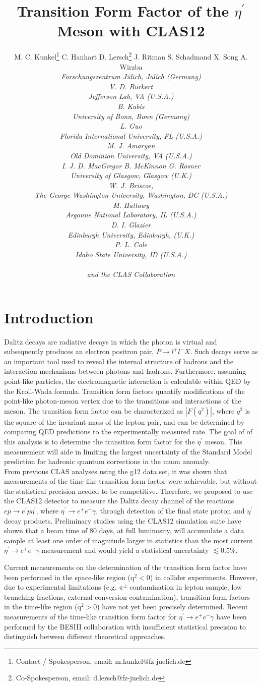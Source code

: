 \documentclass[11pt,a4paper,twocolumn]{article}
\title{Transition Form Factor of the $\eta^{\prime}$ Meson with CLAS12}
\date{}
\author{M. C. Kunkel\thanks{Contact / Spokesperson, email: m.kunkel@fz-juelich.de} \qquad C. Hanhart \qquad D. Lersch\thanks{Co-Spokesperson, email: d.lersch@fz-juelich.de} \qquad J. Ritman \qquad \hspace{2.2cm} S. Schadmand \qquad X. Song \qquad A. Wirzba \\ \vspace{-0.3cm} \it Forschungszentrum J\"ulich, J\"ulich (Germany) \\ \vspace{0.3cm} V. D. Burkert \\ \it Jefferson Lab, VA (U.S.A.)  \\ \vspace{0.3cm} B. Kubis \\ \it University of Bonn, Bonn (Germany) \\ \vspace{0.3cm} L. Guo \\ \it Florida International University, FL (U.S.A.) \\ \vspace{0.3cm} M. J. Amaryan \\ \it Old Dominion University, VA (U.S.A.) \\ \vspace{0.3cm} I. J. D. MacGregor \qquad B. McKinnon \qquad G. Rosner \\ \it University of Glasgow, Glasgow (U.K.) \\ \vspace{0.3cm} W. J. Briscoe,  \\ \it The George Washington University, Washington, DC (U.S.A.) \\ \vspace{0.3cm} M. Hattawy \\ \it Argonne National Laboratory, IL  (U.S.A.) \\ \vspace{0.3cm} D. I. Glazier \\ \it Edinburgh University, Edinburgh, (U.K.) \\ \vspace{0.3cm} P. L. Cole \\ \it Idaho State University, ID (U.S.A.) \\ \  \\ \it \white{space space} and the CLAS Collaboration \newline \newline}
\def\etaP{\eta^{\prime}}
\begin{document}
\maketitle
\clearpage
\section{Introduction}
Dalitz decays are radiative decays in which the photon is virtual and subsequently produces an electron positron pair, $P\rightarrow l^+l^-X$. Such decays serve as an important tool used to reveal the internal structure of hadrons and the interaction mechanisms between photons and hadrons. Furthermore, assuming point-like particles, the electromagnetic interaction is calculable within QED by the Kroll-Wada formula. Transition form factors quantify modifications of the point-like photon-meson vertex due to the transitions and interactions of the meson. The transition form factor can be characterized as $\left| F(q^2)\right|$, where $q^2$ is the square of the invariant mass of the lepton pair, and can be determined by comparing QED predictions to the experimentally measured rate. The goal of of this analysis is to determine the transition form factor for the $\etaP$ meson. This measurement will aide in limiting the largest uncertainty of the Standard Model prediction for hadronic quantum corrections in the muon anomaly.
\\
\indent From previous CLAS analyses using the g12 data set, it was shown that measurements of the time-like transition form factor were achievable, but without the statistical precision needed to be competitive. Therefore, we proposed to use the CLAS12 detector to measure the Dalitz decay channel of the reactions $ep\rightarrow e^{\prime}p\etaP$, where $\etaP \to e^+e^- \gamma$, through detection of the final state proton and $\etaP$ decay products. Preliminary studies using the CLAS12 simulation suite have shown that a beam time of 80 days, at full luminosity, will accumulate a data sample at least one order of magnitude larger in statistics than the most current $\etaP \to e^+e^- \gamma$ measurement and would yield a statistical uncertainty $\lesssim 0.5\%$. 

\indent Current measurements on the determination of the transition form factor have been performed in the space-like region ($\mathrm{q}^2<0$) in collider experiments. However, due to experimental limitations (e.g. $\pi^{\pm}$ contamination in lepton sample, low branching fractions, external conversion contamination), transition form factors in the time-like region ($\mathrm{q}^2>0$) have not yet been precisely determined. Recent measurements of the time-like transition form factor for $\etaP \to e^+e^- \gamma$ have been performed by the BESIII collaboration with insufficient statistical precision to distinguish between different theoretical approaches. 
\end{document}

